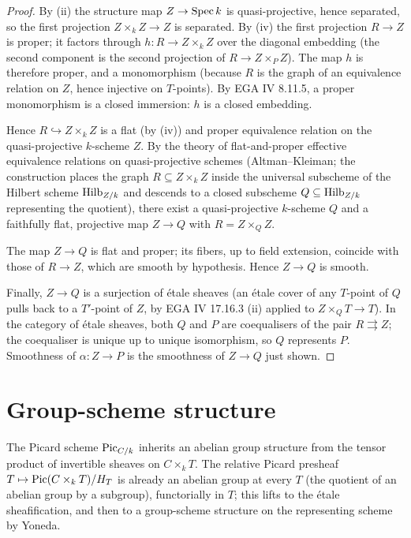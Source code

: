 \begin{proof}

\leanok
  By (ii) the structure map \(Z \to \operatorname{Spec} k\) is quasi-projective, hence
  separated, so the first projection \(Z \times_k Z \to Z\) is separated.
  By (iv) the first projection \(R \to Z\) is proper; it factors through
  \(h : R \to Z \times_k Z\) over the diagonal embedding (the second
  component is the second projection of \(R \to Z \times_P Z\)). The map
  \(h\) is therefore proper, and a monomorphism (because \(R\) is the graph
  of an equivalence relation on \(Z\), hence injective on \(T\)-points).
  By EGA IV 8.11.5, a proper monomorphism is a closed immersion: \(h\) is a
  closed embedding.

  Hence \(R \hookrightarrow Z \times_k Z\) is a flat (by (iv)) and proper
  equivalence relation on the quasi-projective \(k\)-scheme \(Z\). By the
  theory of flat-and-proper effective equivalence relations on
  quasi-projective schemes (Altman--Kleiman; the construction places
  the graph \(R \subseteq Z \times_k Z\) inside the universal subscheme of
  the Hilbert scheme \(\operatorname{Hilb}_{Z/k}\) and descends to a closed subscheme
  \(Q \subseteq \operatorname{Hilb}_{Z/k}\) representing the quotient), there exist a
  quasi-projective \(k\)-scheme \(Q\) and a faithfully flat, projective map
  \(Z \to Q\) with \(R = Z \times_Q Z\).

  The map \(Z \to Q\) is flat and proper; its fibers, up to field
  extension, coincide with those of \(R \to Z\), which are smooth by
  hypothesis. Hence \(Z \to Q\) is smooth.

  Finally, \(Z \to Q\) is a surjection of \'etale sheaves (an \'etale
  cover of any \(T\)-point of \(Q\) pulls back to a \(T'\)-point of \(Z\), by
  EGA IV 17.16.3 (ii) applied to \(Z \times_Q T \to T\)). In the category
  of \'etale sheaves, both \(Q\) and \(P\) are coequalisers of the pair
  \(R \rightrightarrows Z\); the coequaliser is unique up to unique
  isomorphism, so \(Q\) represents \(P\). Smoothness of \(\alpha : Z \to P\)
  is the smoothness of \(Z \to Q\) just shown.
\end{proof}

\section{Group-scheme structure}
\label{sec:fga_pic_group_structure}

The Picard scheme \(\operatorname{Pic}_{C/k}\) inherits an abelian group structure from
the tensor product of invertible sheaves on \(C \times_k T\). The relative
Picard presheaf \(T \mapsto \operatorname{Pic}(C \times_k T)/H_T\) is already an abelian
group at every \(T\) (the quotient of an abelian group by a subgroup),
functorially in \(T\); this lifts to the \'etale sheafification, and then
to a group-scheme structure on the representing scheme by Yoneda.


